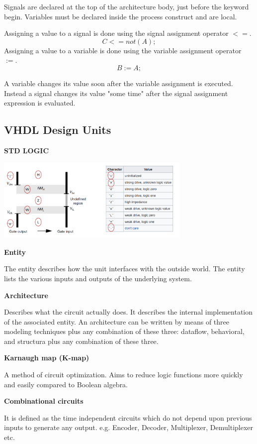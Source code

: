 Signals are declared at the top of the architecture body, just before the keyword begin.
Variables must be declared inside the process construct and are local.

Assigning a value to a signal is done using the signal assignment operator $<=$.
$$C <= not(A);$$
Assigning a value to a variable is done using the variable assignment operator $:=$.
$$ B := A;$$

A variable changes its value soon after the variable assignment is executed. Instead a signal
changes its value "some time" after the signal assignment expression is evaluated.


\subsection{VHDL Design Units}


\textbf{STD LOGIC}

\begin{center}
	\includegraphics[width = 0.7\textwidth]{images/stdlogic.png}
\end{center}



\textbf{Entity}

The entity describes how the unit interfaces with the outside world.
The entity lists the various inputs and outputs of the underlying system.


\textbf{Architecture}

Describes what the circuit actually does. It describes the internal
implementation of the associated entity. An architecture can be written by means of three modeling
techniques plus any combination of these three: dataflow, behavioral, and structura plus any combination of these three.


\textbf{Karnaugh map (K-map)}

A method of circuit optimization. Aims to reduce logic functions
more quickly and easily compared to Boolean algebra.

\textbf{Combinational circuits}

It is defined as the time independent circuits which do not depend upon previous
inputs to generate any output.
e.g. Encoder, Decoder, Multiplexer, Demultiplexer etc.

